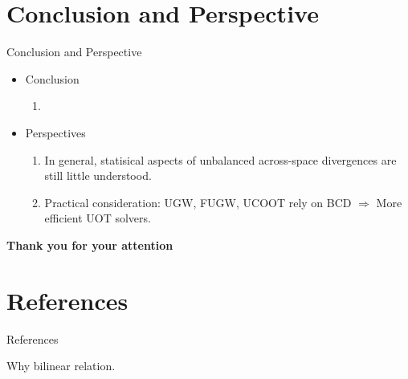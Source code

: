 \documentclass{beamer}
\begin{document}
\section{Conclusion and Perspective}
\begin{frame}{Conclusion and Perspective}
\tiny
\begin{itemize}
  \item Conclusion
  \begin{enumerate}
    \item
  \end{enumerate}

  \item Perspectives
  \begin{enumerate}
    \tiny
    \item In general, statisical aspects of unbalanced across-space divergences
    are still little understood.
    \item Practical consideration: UGW, FUGW, UCOOT rely on BCD
    $\Rightarrow$ More efficient UOT solvers.
  \end{enumerate}
\end{itemize}
\end{frame}

\begin{frame}
  \centering \Large
  \textbf{{Thank you for your attention}}
\end{frame}

\section*{References}
\begin{frame}[allowframebreaks]{References}
\tiny
\printbibliography
\end{frame}

\begin{frame}
  Why bilinear relation.

\end{frame}
\end{document}
